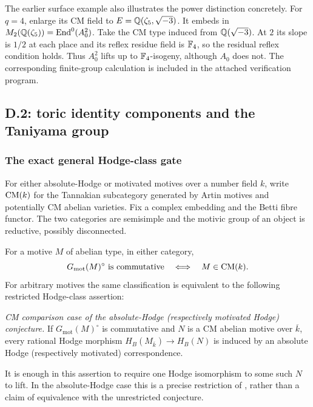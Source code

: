 The earlier surface example also illustrates the power distinction
concretely.  For $q=4$, enlarge its CM field to
$E=\mathbb Q(\zeta_5,\sqrt{-3})$.  It embeds in
$M_2(\mathbb Q(\zeta_5))=\operatorname{End}^0(A_0^2)$.  Take the CM type induced from
$\mathbb Q(\sqrt{-3})$.  At $2$ its slope is $1/2$ at each place and its
reflex residue field is $\mathbb F_4$, so the residual reflex condition
holds.  Thus $A_0^2$ lifts up to $\mathbb F_4$-isogeny, although $A_0$
does not.  The corresponding finite-group calculation is included
in the attached verification program.

\subsection{D.2: toric identity components and the Taniyama group}
\label{subsec:d2}

\subsubsection{The exact general Hodge-class gate}

For either absolute-Hodge or motivated motives over a number field $k$,
write $\operatorname{CM}(k)$ for the Tannakian subcategory generated by Artin motives
and potentially CM abelian varieties.  Fix a complex embedding and the
Betti fibre functor.  The two categories are semisimple and the
motivic group of an object is reductive, possibly disconnected.

\begin{theorem}
\label{thm:d-toric-classification}
For a motive $M$ of abelian type, in either category,
\[
 G_{\mathrm{mot}}(M)^\circ\text{ is commutative}
 \quad\Longleftrightarrow\quad M\in\operatorname{CM}(k).
\]
For arbitrary motives the same classification is equivalent to the
following restricted Hodge-class assertion:

\emph{CM comparison case of the absolute-Hodge (respectively motivated
Hodge) conjecture.}  If $G_{\mathrm{mot}}(M)^\circ$ is commutative and
$N$ is a CM abelian motive over $\overline k$, every rational Hodge
morphism $H_B(M_{\overline k})\to H_B(N)$ is induced by an absolute
Hodge (respectively motivated) correspondence.

It is enough in this assertion to require one Hodge isomorphism to
some such $N$ to lift.  In the absolute-Hodge case this is a precise
restriction of \citet[Conjecture 8.24]{c_delignehodge1982}, rather
than a claim of equivalence with the unrestricted conjecture.
\end{theorem}

